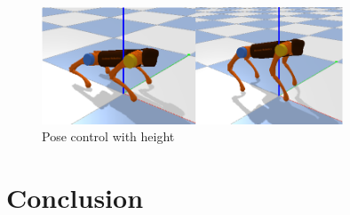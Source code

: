 \begin{figure}[htbp]
   \centering
   \includegraphics[width=0.8\textwidth]{figures/Pose_control_with_height.png}
   \caption{Pose control with height}
   \label{fig: Pose_control_with_height}
\end{figure}

\chapter{Conclusion}
